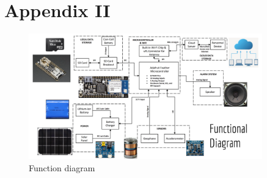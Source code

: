 \documentclass[11pt]{article}
\begin{document}
\section{Appendix II}
\begin{figure}[h]
\centering
\includegraphics[width=0.9\textwidth]{Functional_diagram_p2}
\caption{Function diagram }
\label{fig:SLD}
\end{figure}
\end{document}
